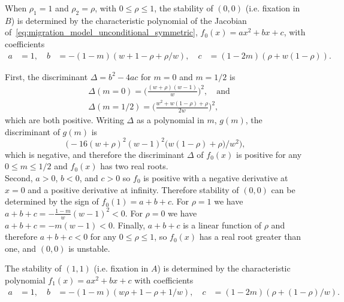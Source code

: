 \documentclass[14pt]{extarticle}
\begin{document}
When $\rho_1=1$ and $\rho_2=\rho$, with $0 \le \rho \le 1$, the stability of $(0,0)$ (i.e. fixation in $B$) is determined by the characteristic polynomial of the Jacobian of~\eqref{eq:migration_model_unconditional_symmetric}, $f_0(x)=ax^2+bx+c$, with coefficients
\begin{equation}
\begin{aligned}
a &= 1, \quad
b &= -(1 - m) (w + 1 - \rho + \rho/w), \quad
c &=  (1 - 2m)(\rho + w(1-\rho)).
\end{aligned}
\end{equation}

First, the discriminant $\Delta = b^2-4ac$ for $m=0$ and $m=1/2$ is
\begin{equation}\begin{aligned}
&\Delta(m=0) = \Big(\frac{(w + \rho) (w-1)}{w}\Big)^2, \quad \text{and} \\
&\Delta(m=1/2) = \Big(\frac{w^2 + w(1-\rho) + \rho}{2 w}\Big)^2,
\end{aligned}\end{equation}
which are both positive.
Writing $\Delta$ as a polynomial in $m$, $g(m)$, the discriminant of $g(m)$ is 
$$
\big(- 16 (w + \rho)^2 (w - 1)^2 \big(w (1 - \rho) + \rho \big) / w^2\big),
$$
which is negative, and therefore the discriminant $\Delta$ of $f_0(x)$ is positive for any $0 \le m \le 1/2$ and $f_0(x)$ has two real roots. \\
Second, $a>0$, $b<0$, and $c>0$ so $f_0$ is positive with a negative derivative at $x=0$ and  a positive derivative at infinity.
Therefore stability of $(0,0)$ can be determined by the sign of $f_0(1)=a+b+c$.
For $\rho=1$ we have $a+b+c=-\frac{1-m}{w}(w-1)^2<0$.
For $\rho=0$ we have $a+b+c=-m(w-1)<0$.
Finally, $a+b+c$ is a linear function of $\rho$ and therefore $a+b+c<0$ for any $0 \le \rho \le 1$, so $f_0(x)$ has a real root greater than one, and $(0,0)$ is unstable.

The stability of $(1,1)$ (i.e. fixation in $A$) is determined by the characteristic polynomial $f_1(x)=ax^2+bx+c$ with coefficients
\begin{equation}
\begin{aligned}
a &= 1, \quad
b &= -(1 - m) (w\rho + 1 - \rho + 1/w), \quad
c &=  (1 - 2m)(\rho + (1-\rho)/w).
\end{aligned}
\end{equation}
\end{document}
